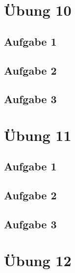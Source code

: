 \documentclass[a4paper]{article}
\begin{document}
\newpage
\section{Übung 10}
\subsection{Aufgabe 1}

\subsection{Aufgabe 2}


\subsection{Aufgabe 3}




\newpage
\section{Übung 11}
\subsection{Aufgabe 1}

\subsection{Aufgabe 2}


\subsection{Aufgabe 3}




\newpage
\section{Übung 12}
\end{document}
